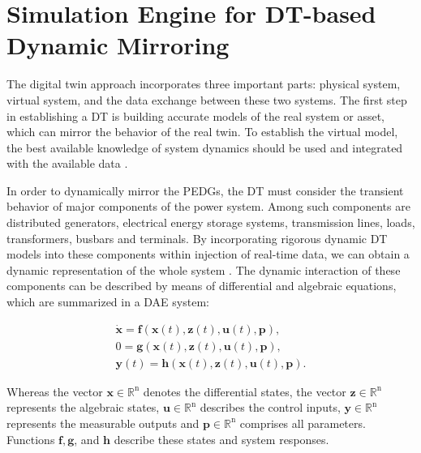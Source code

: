 \chapter{Simulation Engine for DT-based Dynamic Mirroring}\label{ch:ch3}

The digital twin approach incorporates three important parts: physical system, virtual system, and the data exchange between these two systems. The first step in establishing a DT is building accurate models of the real system or asset, which can mirror the behavior of the real twin. To establish the virtual model, the best available knowledge of system dynamics should be used and integrated with the available data \autocite{jrn_bazmohammadi_2022}. 

In order to dynamically mirror the PEDGs, the DT must consider the transient behavior of major components of the power system. Among such components are distributed generators, electrical energy storage systems, transmission lines, loads, transformers, busbars and terminals. By incorporating rigorous dynamic DT models into these components within injection of real-time data, we can obtain a dynamic representation of the whole system \autocite{10938101}. The dynamic interaction of these components can be described by means of differential and algebraic equations, which are summarized in a DAE system:

\begin{equation}
    \begin{array}{l}
\dot{\boldsymbol{x}}=\boldsymbol{f}(\boldsymbol{x}(t), \boldsymbol{z}(t), \boldsymbol{u}(t), \boldsymbol{p}), \\
0=\boldsymbol{g}(\boldsymbol{x}(t), \boldsymbol{z}(t), \boldsymbol{u}(t), \boldsymbol{p}), \\
\boldsymbol{y}(t)=\boldsymbol{h}(\boldsymbol{x}(t), \boldsymbol{z}(t), \boldsymbol{u}(t), \boldsymbol{p}).
\end{array}
\end{equation}

Whereas the vector $\boldsymbol{x} \in \mathbb{R}^{\mathrm{n}}$ denotes the differential states, the vector $\boldsymbol{z} \in \mathbb{R}^{\mathrm{n}}$ represents the algebraic states, $\boldsymbol{u} \in \mathbb{R}^{\mathrm{n}}$ describes the control inputs, $\boldsymbol{y} \in \mathbb{R}^{\mathrm{n}}$ represents the measurable outputs and $\boldsymbol{p} \in \mathbb{R}^{\mathrm{n}}$ comprises all parameters.  Functions $\boldsymbol{f}, \boldsymbol{g}$, and $\boldsymbol{h}$ describe these states and system responses.

